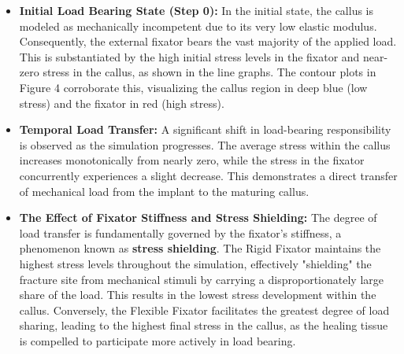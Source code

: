 \documentclass{article}
\begin{document}
\begin{itemize}
  \item \textbf{Initial Load Bearing State (Step 0):} In the initial state, the callus is modeled as mechanically incompetent due to its very low elastic modulus. Consequently, the external fixator bears the vast majority of the applied load. This is substantiated by the high initial stress levels in the fixator and near-zero stress in the callus, as shown in the line graphs. The contour plots in Figure 4 corroborate this, visualizing the callus region in deep blue (low stress) and the fixator in red (high stress).

  \item \textbf{Temporal Load Transfer:} A significant shift in load-bearing responsibility is observed as the simulation progresses. The average stress within the callus increases monotonically from nearly zero, while the stress in the fixator concurrently experiences a slight decrease. This demonstrates a direct transfer of mechanical load from the implant to the maturing callus.

  \item \textbf{The Effect of Fixator Stiffness and Stress Shielding:} The degree of load transfer is fundamentally governed by the fixator's stiffness, a phenomenon known as \textbf{stress shielding}. The Rigid Fixator maintains the highest stress levels throughout the simulation, effectively "shielding" the fracture site from mechanical stimuli by carrying a disproportionately large share of the load. This results in the lowest stress development within the callus. Conversely, the Flexible Fixator facilitates the greatest degree of load sharing, leading to the highest final stress in the callus, as the healing tissue is compelled to participate more actively in load bearing.
\end{itemize}
\end{document}
